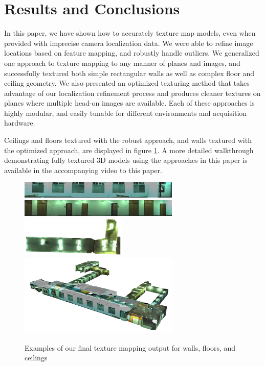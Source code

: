 \documentclass[10pt,twocolumn,letterpaper]{article}
\begin{document}
\section{Results and Conclusions}
\label{sec:resultsAndConclusions}
In this paper, we have shown how to accurately texture map models,
even when provided with imprecise camera localization data. We were
able to refine image locations based on feature mapping, and robustly
handle outliers.  We generalized one approach to texture mapping to
any manner of planes and images, and successfully textured both simple
rectangular walls as well as complex floor and ceiling geometry. We
also presented an optimized texturing method that takes advantage of
our localization refinement process and produces cleaner textures on
planes where multiple head-on images are available. Each of these
approaches is highly modular, and easily tunable for different
environments and acquisition hardware.

Ceilings and floors textured with the robust approach, and walls
textured with the optimized approach, are displayed in figure
\ref{fig:results}. A more detailed walkthrough demonstrating fully
textured 3D models using the approaches in this paper is available in
the accompanying video to this paper.

\begin{figure}
  \centering
  \includegraphics[width=3in]{4thfloor21.jpg}
  \includegraphics[width=3in]{4thfloor61.jpg}
  \includegraphics[width=2in]{4thfloor8.jpg}
  \includegraphics[width=3in]{fullmodel.png}
  \caption{Examples of our final texture mapping output for walls,
    floors, and ceilings}
  \label{fig:results}
\end{figure}

{\small   }
\end{document}
